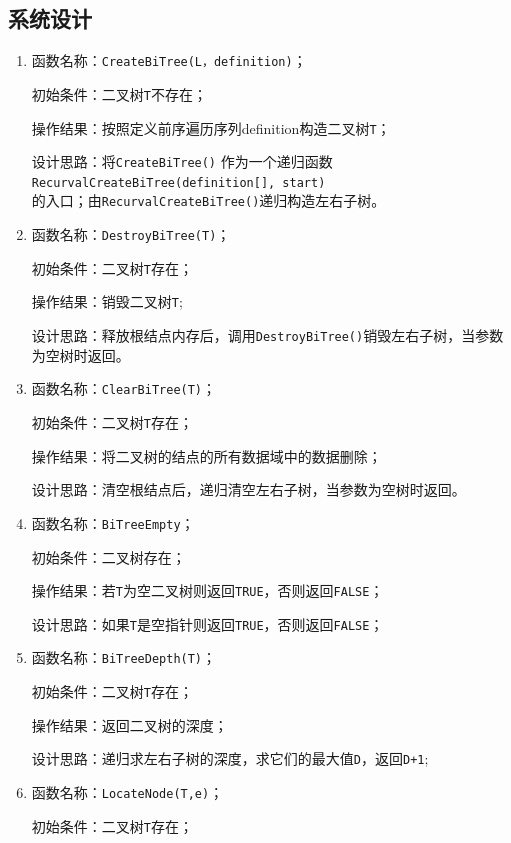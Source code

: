 \documentclass[supercite]{Experimental_Report}
\theoremstyle{definition}
\begin{document}
\subsection{系统设计}
\begin{enumerate}
	\item 函数名称：\verb|CreateBiTree(L，definition)|；

	初始条件：二叉树\verb|T|不存在；
	
	操作结果：按照定义前序遍历序列definition构造二叉树\verb|T|；
	
	设计思路：将\verb|CreateBiTree()| 作为一个递归函数 \\ \verb|RecurvalCreateBiTree(definition[], start)| \\的入口；由\verb|RecurvalCreateBiTree()|递归构造左右子树。

	\item 函数名称：\verb|DestroyBiTree(T)|；

	初始条件：二叉树\verb|T|存在；
	
	操作结果：销毁二叉树\verb|T|;
	
	设计思路：释放根结点内存后，调用\verb|DestroyBiTree()|销毁左右子树，当参数为空树时返回。
	
	\item 函数名称：\verb|ClearBiTree(T)|；
	
	初始条件：二叉树\verb|T|存在；

	操作结果：将二叉树的结点的所有数据域中的数据删除；

	设计思路：清空根结点后，递归清空左右子树，当参数为空树时返回。

	\item 函数名称：\verb|BiTreeEmpty|；
	
	初始条件：二叉树存在；

	操作结果：若\verb|T|为空二叉树则返回\verb|TRUE|，否则返回\verb|FALSE|；

	设计思路：如果\verb|T|是空指针则返回\verb|TRUE|，否则返回\verb|FALSE|；

	\item 函数名称：\verb|BiTreeDepth(T)|；
	
	初始条件：二叉树\verb|T|存在；

	操作结果：返回二叉树的深度；

	设计思路：递归求左右子树的深度，求它们的最大值\verb|D|，返回\verb|D+1|;

	\item 函数名称：\verb|LocateNode(T,e)|；
	
	初始条件：二叉树\verb|T|存在；


\end{enumerate}
\end{document}

